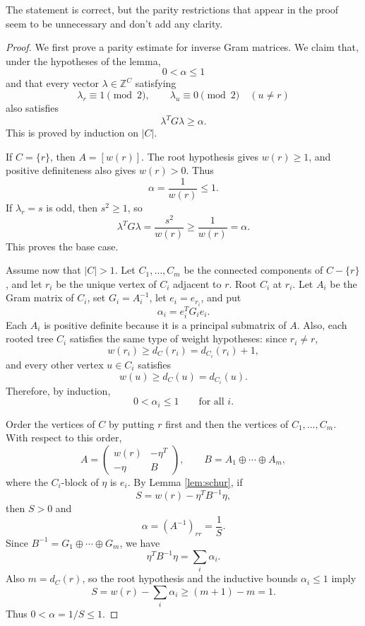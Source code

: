 \documentclass[12pt]{article}
\newcommand{\Z}{\mathbb{Z}}
\newcommand{\review}[1]{\begin{reviewbox}#1\end{reviewbox}}
\begin{document}
\review{The statement is correct, but the parity restrictions that appear in the proof seem to be unnecessary and don't add any clarity.}

\begin{proof}
We first prove a parity estimate for inverse Gram matrices. We claim that, under the hypotheses of the lemma,
\[
0<\alpha\le 1
\]
and that every vector \(\lambda\in\Z^C\) satisfying
\[
\lambda_r\equiv 1\pmod 2,
\qquad
\lambda_u\equiv 0\pmod 2\quad(u\ne r)
\]
also satisfies
\[
\lambda^T G\lambda\ge \alpha.
\]
This is proved by induction on \(|C|\).

If \(C=\{r\}\), then \(A=[w(r)]\). The root hypothesis gives \(w(r)\ge 1\), and positive definiteness also gives \(w(r)>0\). Thus
\[
\alpha=\frac{1}{w(r)}\le 1.
\]
If \(\lambda_r=s\) is odd, then \(s^2\ge 1\), so
\[
\lambda^TG\lambda=\frac{s^2}{w(r)}\ge \frac{1}{w(r)}=\alpha.
\]
This proves the base case.

Assume now that \(|C|>1\). Let \(C_1,\dots,C_m\) be the connected components of \(C-\{r\}\), and let \(r_i\) be the unique vertex of \(C_i\) adjacent to \(r\). Root \(C_i\) at \(r_i\). Let \(A_i\) be the Gram matrix of \(C_i\), set \(G_i=A_i^{-1}\), let \(e_i=e_{r_i}\), and put
\[
\alpha_i=e_i^TG_ie_i.
\]
Each \(A_i\) is positive definite because it is a principal submatrix of \(A\). Also, each rooted tree \(C_i\) satisfies the same type of weight hypotheses: since \(r_i\ne r\),
\[
w(r_i)\ge d_C(r_i)=d_{C_i}(r_i)+1,
\]
and every other vertex \(u\in C_i\) satisfies
\[
w(u)\ge d_C(u)=d_{C_i}(u).
\]
Therefore, by induction,
\[
0<\alpha_i\le 1
\qquad\text{for all }i.
\]

Order the vertices of \(C\) by putting \(r\) first and then the vertices of \(C_1,\dots,C_m\). With respect to this order,
\[
A=
\begin{pmatrix}
w(r) & -\eta^T\\
-\eta & B
\end{pmatrix},
\qquad
B=A_1\oplus\cdots\oplus A_m,
\]
where the \(C_i\)-block of \(\eta\) is \(e_i\). By Lemma \ref{lem:schur}, if
\[
S=w(r)-\eta^TB^{-1}\eta,
\]
then \(S>0\) and
\[
\alpha=(A^{-1})_{rr}=\frac{1}{S}.
\]
Since \(B^{-1}=G_1\oplus\cdots\oplus G_m\), we have
\[
\eta^TB^{-1}\eta=\sum_i \alpha_i.
\]
Also \(m=d_C(r)\), so the root hypothesis and the inductive bounds \(\alpha_i\le 1\) imply
\[
S=w(r)-\sum_i\alpha_i
\ge (m+1)-m
=1.
\]
Thus \(0<\alpha=1/S\le 1\).


\end{proof}
\end{document}
